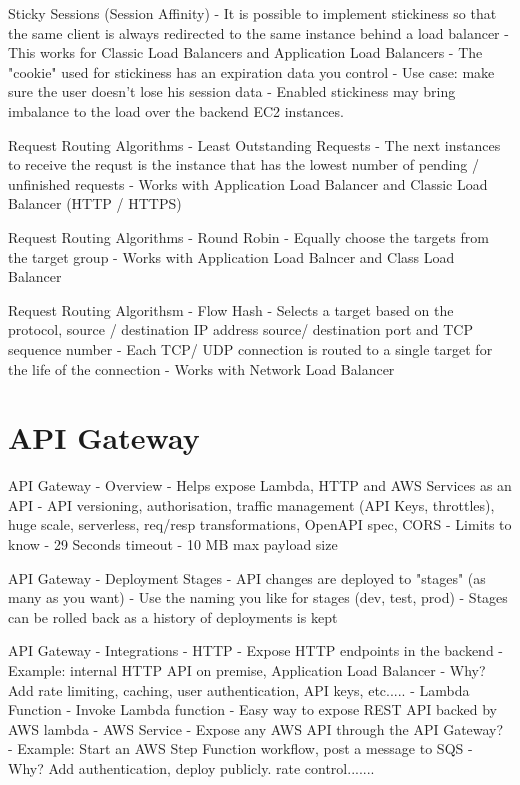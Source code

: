 \documentclass[11pt]{book}
\begin{document}
    Sticky Sessions (Session Affinity)
    - It is possible to implement stickiness so that the same client is always redirected to the same instance behind a load balancer
    - This works for Classic Load Balancers and Application Load Balancers
    - The "cookie" used for stickiness has an expiration data you control
    - Use case: make sure the user doesn't lose his session data
    - Enabled stickiness may bring imbalance to the load over the backend EC2 instances.

    Request Routing Algorithms - Least Outstanding Requests
    - The next instances to receive the requst is the instance that has the lowest number of pending / unfinished requests
    - Works with Application Load Balancer and Classic Load Balancer (HTTP / HTTPS)

    Request Routing Algorithms - Round Robin
    - Equally choose the targets from the target group
    - Works with Application Load Balncer and Class Load Balancer

    Request Routing Algorithsm - Flow Hash
    - Selects a target based on the protocol, source / destination IP address source/ destination port and TCP sequence number
    - Each TCP/ UDP connection is routed to a single target for the life of the connection
    - Works with Network Load Balancer

    \section{API Gateway}
    API Gateway - Overview
    - Helps expose Lambda, HTTP and AWS Services as an API
    - API versioning, authorisation, traffic management (API Keys, throttles), huge scale, serverless, req/resp transformations, OpenAPI spec, CORS
    - Limits to know
        - 29 Seconds timeout
        - 10 MB max payload size

    API Gateway - Deployment Stages
    - API changes are deployed to "stages" (as many as you want)
    - Use the naming you like for stages (dev, test, prod)
    - Stages can be rolled back as a history of deployments is kept

    API Gateway - Integrations
    - HTTP
        - Expose HTTP endpoints in the backend
        - Example: internal HTTP API on premise, Application Load Balancer
        - Why? Add rate limiting, caching, user authentication, API keys, etc.....
    - Lambda Function
        - Invoke Lambda function
        - Easy way to expose REST API backed by AWS lambda
    - AWS Service
        - Expose any AWS API through the API Gateway?
        - Example: Start an AWS Step Function workflow, post a message to SQS
        - Why? Add authentication, deploy publicly. rate control.......
\end{document}
